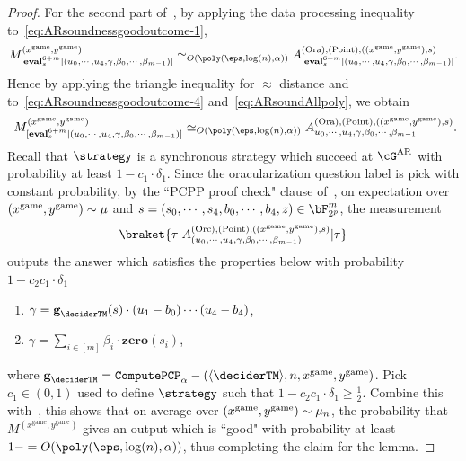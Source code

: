 \begin{proof}
	For the second part of~, by applying the data processing inequality to~\eqref{eq:ARsoundnessgoodoutcome-1},
	\begin{equation} \label{eq:ARsoundnessgoodoutcome-4}
		M^{(x^{\text{game}}, y^{\text{game}})}_{[\textbf{eval}_s^{6+m}|( u_0, \cdots, u_4, \gamma, \beta_0, \cdots,\beta_{m-1})]} \simeq_{O(\poly(\eps, \log(n), \alpha))} A^{(\text{Ora}), (\text{Point}), ((x^{\game}, y^{\game}) ,s)}_{[\textbf{eval}_s^{6+m}|( u_0, \cdots, u_4, \gamma, \beta_0, \cdots,\beta_{m-1})]}.
	\end{equation}
	Hence by applying the triangle inequality for $\approx$ distance and~ to~\eqref{eq:ARsoundnessgoodoutcome-4} and~\eqref{eq:ARsoundAllpoly}, we obtain
	\begin{equation}~\label{eq:ARsoundnessgoodoutcome-5}
		M^{(x^{\text{game}}, y^{\text{game}})}_{[\textbf{eval}_s^{6+m}|( u_0, \cdots, u_4, \gamma, \beta_0, \cdots,\beta_{m-1})]} \simeq_{O(\poly(\eps, \log(n), \alpha))}  A^{(\text{Ora}), (\text{Point}), ((x^{\game}, y^{\game}) ,s)}_{u_0, \cdots, u_4, \gamma, \beta_0, \cdots,\beta_{m-1}}. 
	\end{equation}
	Recall that $\strategy$ is a synchronous strategy which succeed at $\cG^{\text{AR}}$ with probability at least $1 -  c_1 \cdot \delta_1$. Since the oracularization question label is pick with constant probability, by the ``PCPP proof check" clause of~, on expectation over $(x^{\text{game}},y^{\text{game}}) \sim \mu$ and $s = (s_0, \cdots, s_4, b_0, \cdots, b_4, z) \in \bF_{2^p}^m$, the measurement 
	\begin{equation*}
		\braket{\tau|A_{(u_0, \cdots, u_4, \gamma, \beta_0, \cdots, \beta_{m-1} )}^{(\text{Orc}), (\text{Point}), ((x^{\game}, y^{\game}),  s)}|\tau} 
	\end{equation*}	
	outputs the answer which satisfies the properties below with probability $1 - c_2 c_1 \cdot\delta_1$
	\begin{enumerate}
		\item $\gamma = \textbf{g}_{\deciderTM}(s) \cdot (u_1 - b_0) \cdots (u_4 - b_4)$,
		\item $\gamma = \sum_{i \in[m]} \beta_i \cdot \textbf{zero}(s_i)$,
	\end{enumerate}
	where $\textbf{g}_{\deciderTM} = \mathtt{ComputePCP}_{\alpha}-(\langle \deciderTM \rangle ,n, x^{\text{game}}, y^{\text{game}})$. Pick $c_1 \in (0,1)$ used to define $\strategy$ such that $1 - c_2 c_1 \cdot\delta_1 \geq \frac{1}{2}$. Combine this with~, this shows that on average over $(x^{\text{game}}, y^{\text{game}}) \sim \mu_n$, the probability that $M^{(x^{\text{game}}, y^{\text{game}})}$ gives an output which is ``good" with probability at least $1-= O(\poly(\eps, \log(n), \alpha))$, thus completing the claim for the lemma. 
\end{proof}
